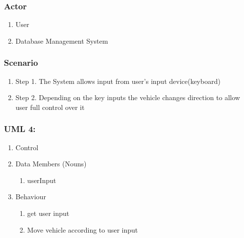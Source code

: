 \documentclass{article}
\begin{document}
\subsubsection{Actor}

\begin{enumerate}
    \item  User
    \item  Database Management System

\end{enumerate}
\subsubsection{Scenario}

\begin{enumerate}
    \item Step 1. The System allows input from user's input device(keyboard)
    \item Step 2. Depending on the key inputs the vehicle changes direction to allow user full control over it

\end{enumerate}

\subsubsection{UML 4:}
\begin{enumerate}
    \item Control
    \item Data Members (Nouns)
          \begin{enumerate}
              \item userInput
             
          \end{enumerate}
    \item Behaviour
        \begin{enumerate}
            \item get user input
            \item Move vehicle according to user input
        \end{enumerate}
\end{enumerate}

\pagebreak

\end{document}
